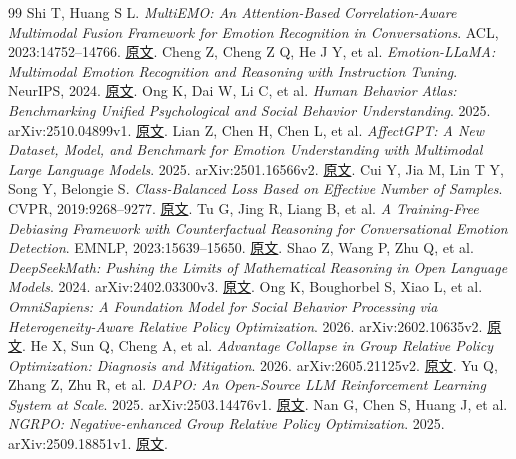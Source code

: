 \documentclass[UTF8,a4paper,11pt,fontset=windows]{ctexart}
\begin{document}
\clearpage
\begin{thebibliography}{99}
\small
\setlength{\itemsep}{4pt}
 Shi T, Huang S L. \emph{MultiEMO: An Attention-Based Correlation-Aware Multimodal Fusion Framework for Emotion Recognition in Conversations}. ACL, 2023:14752–14766. \href{https://aclanthology.org/2023.acl-long.824/}{原文}.
 Cheng Z, Cheng Z Q, He J Y, et al. \emph{Emotion-LLaMA: Multimodal Emotion Recognition and Reasoning with Instruction Tuning}. NeurIPS, 2024. \href{https://arxiv.org/abs/2406.11161v2}{原文}.
 Ong K, Dai W, Li C, et al. \emph{Human Behavior Atlas: Benchmarking Unified Psychological and Social Behavior Understanding}. 2025. arXiv:2510.04899v1. \href{https://arxiv.org/abs/2510.04899v1}{原文}.
 Lian Z, Chen H, Chen L, et al. \emph{AffectGPT: A New Dataset, Model, and Benchmark for Emotion Understanding with Multimodal Large Language Models}. 2025. arXiv:2501.16566v2. \href{https://arxiv.org/abs/2501.16566v2}{原文}.
 Cui Y, Jia M, Lin T Y, Song Y, Belongie S. \emph{Class-Balanced Loss Based on Effective Number of Samples}. CVPR, 2019:9268–9277. \href{https://openaccess.thecvf.com/content_CVPR_2019/html/Cui_Class-Balanced_Loss_Based_on_Effective_Number_of_Samples_CVPR_2019_paper.html}{原文}.
 Tu G, Jing R, Liang B, et al. \emph{A Training-Free Debiasing Framework with Counterfactual Reasoning for Conversational Emotion Detection}. EMNLP, 2023:15639–15650. \href{https://aclanthology.org/2023.emnlp-main.967/}{原文}.
 Shao Z, Wang P, Zhu Q, et al. \emph{DeepSeekMath: Pushing the Limits of Mathematical Reasoning in Open Language Models}. 2024. arXiv:2402.03300v3. \href{https://arxiv.org/abs/2402.03300v3}{原文}.
 Ong K, Boughorbel S, Xiao L, et al. \emph{OmniSapiens: A Foundation Model for Social Behavior Processing via Heterogeneity-Aware Relative Policy Optimization}. 2026. arXiv:2602.10635v2. \href{https://arxiv.org/abs/2602.10635v2}{原文}.
 He X, Sun Q, Cheng A, et al. \emph{Advantage Collapse in Group Relative Policy Optimization: Diagnosis and Mitigation}. 2026. arXiv:2605.21125v2. \href{https://arxiv.org/abs/2605.21125v2}{原文}.
 Yu Q, Zhang Z, Zhu R, et al. \emph{DAPO: An Open-Source LLM Reinforcement Learning System at Scale}. 2025. arXiv:2503.14476v1. \href{https://arxiv.org/abs/2503.14476v1}{原文}.
 Nan G, Chen S, Huang J, et al. \emph{NGRPO: Negative-enhanced Group Relative Policy Optimization}. 2025. arXiv:2509.18851v1. \href{https://arxiv.org/abs/2509.18851v1}{原文}.

\end{thebibliography}
\end{document}
